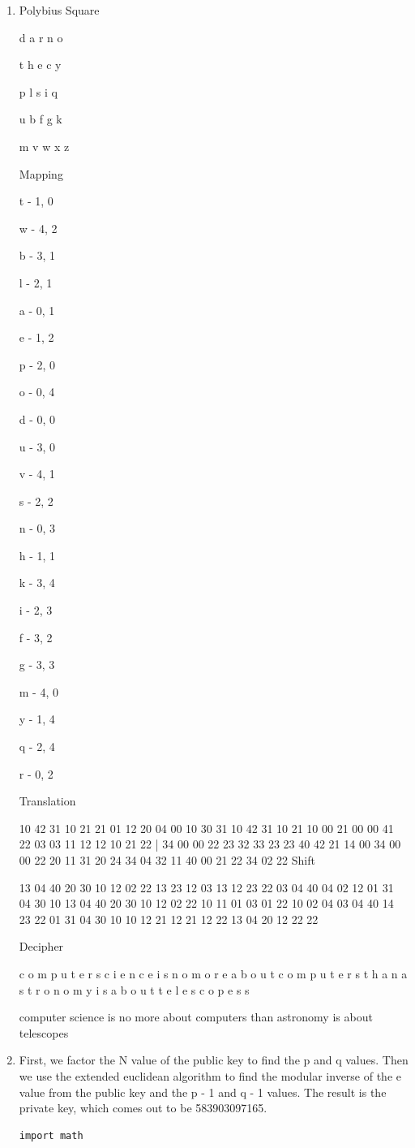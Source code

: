 \documentclass{article}
\begin{document}
\begin{enumerate}
	\clearpage

	\item
Polybius Square

d	a	r	n	o

t	h	e	c	y

p	l	s	i	q

u	b	f	g	k

m	v	w	x	z

Mapping

t - 1, 0

w - 4, 2

b - 3, 1

l - 2, 1

a - 0, 1

e - 1, 2

p - 2, 0

o - 0, 4

d - 0, 0

u - 3, 0

v - 4, 1

s - 2, 2

n - 0, 3

h - 1, 1

k - 3, 4

i - 2, 3

f - 3, 2

g - 3, 3

m - 4, 0

y - 1, 4

q - 2, 4

r - 0, 2

Translation

10 42 31 10 21 21 01 12 20 04 00 10 30 31 10 42 31 10 21 10 00 21 00 00 41 22 03 03 11 12 12 10 21 22 | 34 00 00 22 23 32 33 23 23 40 42 21 14 00 34 00 00 22 20 11 31 20 24 34 04 32 11 40 00 21 22 34 02 22
\clearpage
Shift

13 04 40 20 30 10 12 02 22 13 23 12 03 13 12 23 22 03 04 40 04 02 12 01 31 04 30 10 13 04 40 20 30 10 12 02 22 10 11 01 03 01 22 10 02 04 03 04 40 14 23 22 01 31 04 30 10 10 12 21 12 21 12 22 13 04 20 12 22 22

Decipher

c o m p u t e r s c i e n c e i s n o m o r e a b o u t c o m p u t e r s t h a n a s t r o n o m y i s a b o u t t e l e s c o p e s s

computer science is no more about computers than astronomy is about telescopes

	\item First, we factor the N value of the public key to find the p and q values. Then we use the extended euclidean algorithm to find the modular inverse of the e value from
    the public key and the p - 1 and q - 1 values. The result is the private key, which comes out to be 583903097165.
    \clearpage
    \begin{lstlisting}
import math


\end{lstlisting}
\end{enumerate}
\end{document}
